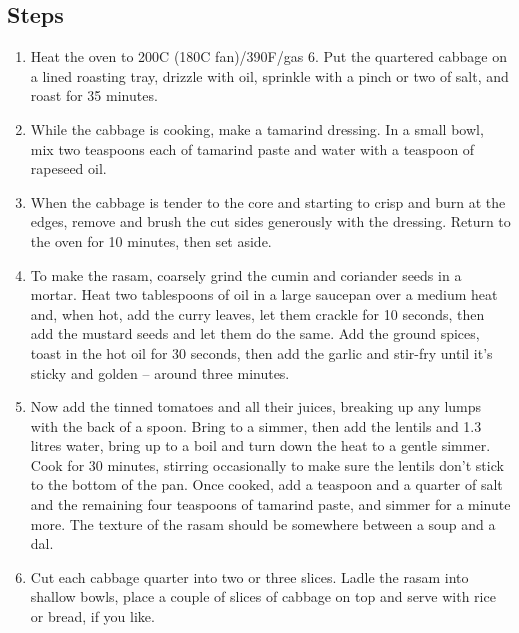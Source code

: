 \documentclass{book}
\begin{document}
\subsection*{Steps}
\begin{enumerate}
\item Heat the oven to 200C (180C fan)/390F/gas 6. Put the quartered cabbage on a lined roasting tray, drizzle with oil, sprinkle with a pinch or two of salt, and roast for 35 minutes.
\item While the cabbage is cooking, make a tamarind dressing. In a small bowl, mix two teaspoons each of tamarind paste and water with a teaspoon of rapeseed oil.
\item When the cabbage is tender to the core and starting to crisp and burn at the edges, remove and brush the cut sides generously with the dressing. Return to the oven for 10 minutes, then set aside.
\item To make the rasam, coarsely grind the cumin and coriander seeds in a mortar. Heat two tablespoons of oil in a large saucepan over a medium heat and, when hot, add the curry leaves, let them crackle for 10 seconds, then add the mustard seeds and let them do the same. Add the ground spices, toast in the hot oil for 30 seconds, then add the garlic and stir-fry until it’s sticky and golden – around three minutes.
\item Now add the tinned tomatoes and all their juices, breaking up any lumps with the back of a spoon. Bring to a simmer, then add the lentils and 1.3 litres water, bring up to a boil and turn down the heat to a gentle simmer. Cook for 30 minutes, stirring occasionally to make sure the lentils don’t stick to the bottom of the pan. Once cooked, add a teaspoon and a quarter of salt and the remaining four teaspoons of tamarind paste, and simmer for a minute more. The texture of the rasam should be somewhere between a soup and a dal.
\item Cut each cabbage quarter into two or three slices. Ladle the rasam into shallow bowls, place a couple of slices of cabbage on top and serve with rice or bread, if you like.
\end{enumerate}
\newpage
\end{document}
